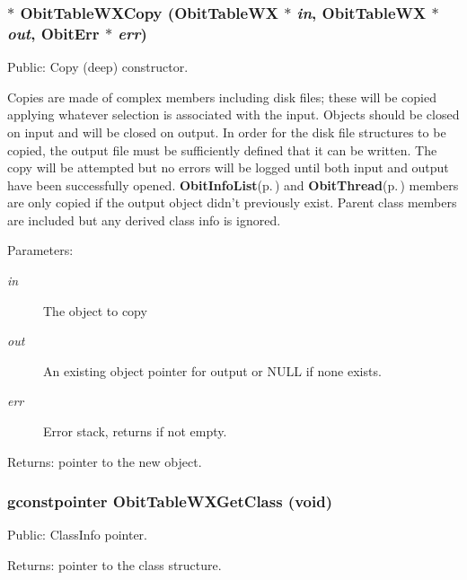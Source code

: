 \subsubsection{$\ast$ Obit\-Table\-WXCopy ({\bf Obit\-Table\-WX} $\ast$ {\em in}, {\bf Obit\-Table\-WX} $\ast$ {\em out}, {\bf Obit\-Err} $\ast$ {\em err})}\label{ObitTableWX_8c_a20}


Public: Copy (deep) constructor. 

Copies are made of complex members including disk files; these will be copied applying whatever selection is associated with the input. Objects should be closed on input and will be closed on output. In order for the disk file structures to be copied, the output file must be sufficiently defined that it can be written. The copy will be attempted but no errors will be logged until both input and output have been successfully opened. {\bf Obit\-Info\-List}{\rm (p.\,\pageref{structObitInfoList})} and {\bf Obit\-Thread}{\rm (p.\,\pageref{structObitThread})} members are only copied if the output object didn't previously exist. Parent class members are included but any derived class info is ignored. \begin{Desc}
\item[Parameters:]
\begin{description}
\item[{\em in}]The object to copy \item[{\em out}]An existing object pointer for output or NULL if none exists. \item[{\em err}]Error stack, returns if not empty. \end{description}
\end{Desc}
\begin{Desc}
\item[Returns:]pointer to the new object. \end{Desc}
\subsubsection{\setlength{\rightskip}{0pt plus 5cm}gconstpointer Obit\-Table\-WXGet\-Class (void)}\label{ObitTableWX_8c_a17}


Public: Class\-Info pointer. 

\begin{Desc}
\item[Returns:]pointer to the class structure. \end{Desc}
